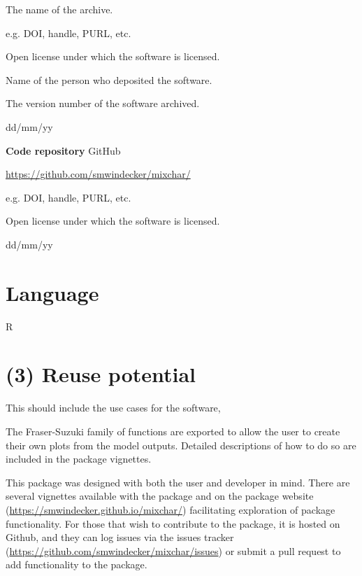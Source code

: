 \documentclass{jors}\usepackage[]{graphicx}\usepackage[]{color}
\begin{document}
\begin{description}[noitemsep,topsep=0pt]
	\item[Name:] The name of the archive.
	\item[Persistent identifier:] e.g. DOI, handle, PURL, etc.
	\item[Licence:] Open license under which the software is licensed.
	\item[Publisher:] Name of the person who deposited the software.
	\item[Version published:] The version number of the software archived.
	\item[Date published:] dd/mm/yy
\end{description}


{\bf Code repository} GitHub

\begin{description}[noitemsep,topsep=0pt]
	\item[Name:] \url{https://github.com/smwindecker/mixchar/}
	\item[Persistent identifier:] e.g. DOI, handle, PURL, etc.
	\item[Licence:] Open license under which the software is licensed.
	\item[Date published:] dd/mm/yy
\end{description}

\section*{Language}
R

\section*{(3) Reuse potential}
This should include the use cases for the software,

The Fraser-Suzuki family of functions are exported to allow the user to create their own plots from the model outputs. Detailed descriptions of how to do so are included in the package vignettes.

This package was designed with both the user and developer in mind. There are several vignettes available with the package and on the package website (\url{https://smwindecker.github.io/mixchar/}) facilitating exploration of package functionality. For those that wish to contribute to the package, it is hosted on Github, and they can log issues via the issues tracker (\url{https://github.com/smwindecker/mixchar/issues}) or submit a pull request to add functionality to the package.
\end{document}
